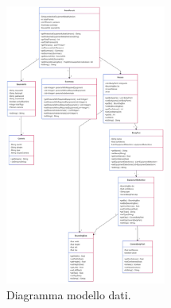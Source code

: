 \begin{figure}[htbp]
    \centering
    \includegraphics[width=0.47\textwidth]{figures/data-model.png}
    \caption{Diagramma modello dati.} 
    \label{fig:data-model}
\end{figure}

